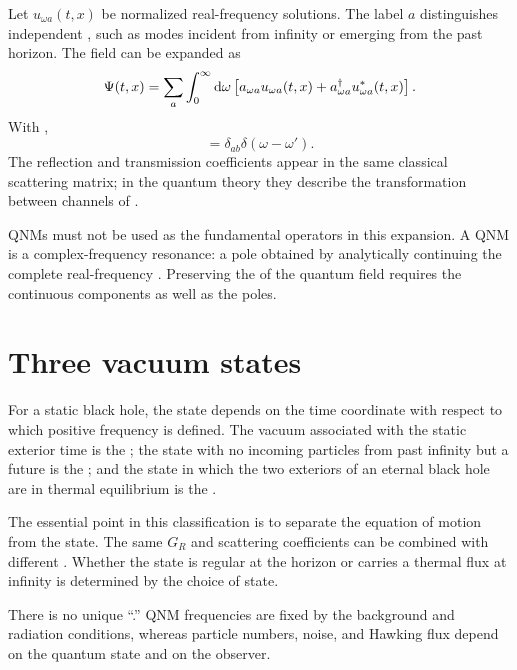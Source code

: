 Let $u_{\omega a}(t,x)$ be normalized real-frequency solutions. The label $a$ distinguishes independent , such as modes incident from infinity or emerging from the past horizon. The field can be expanded as
\begin{equation}
\Psi(t,x)
=
\sum_a
\int_0^\infty\mathrm{d}\omega
\left[
a_{\omega a}u_{\omega a}(t,x)
+a^\dagger_{\omega a}u^*_{\omega a}(t,x)
\right].
\label{eq:master-mode-expansion}
\end{equation}
With ,
\begin{equation}
[a_{\omega a},a^\dagger_{\omega' b}]
=
\delta_{ab}\delta(\omega-\omega').
\end{equation}
The reflection and transmission coefficients appear in the same classical scattering matrix; in the quantum theory they describe the transformation between channels of .

QNMs must not be used as the fundamental operators in this expansion. A QNM is a complex-frequency resonance: a pole obtained by analytically continuing the complete real-frequency . Preserving the  of the quantum field requires the continuous components as well as the poles.

\section{Three vacuum states}

For a static black hole, the state depends on the time coordinate with respect to which positive frequency is defined. The vacuum associated with the static exterior time is the ; the state with no incoming particles from past infinity but a future  is the ; and the state in which the two exteriors of an eternal black hole are in thermal equilibrium is the .

The essential point in this classification is to separate the equation of motion from the state. The same $G_R$ and scattering coefficients can be combined with different . Whether the state is regular at the horizon or carries a thermal flux at infinity is determined by the choice of state.

\begin{warningbox}
There is no unique ``.'' QNM frequencies are fixed by the background and radiation conditions, whereas particle numbers, noise, and Hawking flux depend on the quantum state and on the observer.
\end{warningbox}

